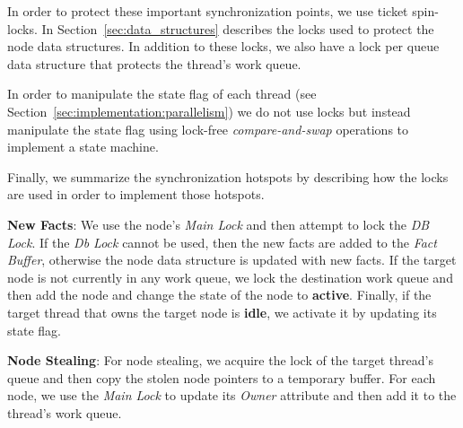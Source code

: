 In order to protect these important synchronization points, we use ticket
spin-locks. In Section~\ref{sec:data_structures} describes the locks used to
protect the node data structures. In addition to these locks, we also have a
lock per queue data structure that protects the thread's work queue.

In order to manipulate the state flag of each thread (see
Section~\ref{sec:implementation:parallelism}) we do not use locks but instead
manipulate the state flag using lock-free \emph{compare-and-swap} operations to
implement a state machine.

Finally, we summarize the synchronization hotspots by describing how the locks
are used in order to implement those hotspots.

\begin{description}

   \item \textbf{New Facts}: We use the node's \emph{Main Lock} and then attempt
      to lock the \emph{DB Lock}. If the \emph{Db Lock} cannot be used, then the
      new facts are added to the \emph{Fact Buffer}, otherwise the node data
      structure is updated with new facts. If the target node is not currently
      in any work queue, we lock the destination work queue and then add the
      node and change the state of the node to \textbf{active}. Finally, if the
      target thread that owns the target node is \textbf{idle}, we activate it
      by updating its state flag.

\item \textbf{Node Stealing}: For node stealing, we acquire the lock of the
   target thread's queue and then copy the stolen node pointers to a temporary
   buffer. For each node, we use the \emph{Main Lock} to update its
   \emph{Owner} attribute and then add it to the thread's work queue.

\end{description}

